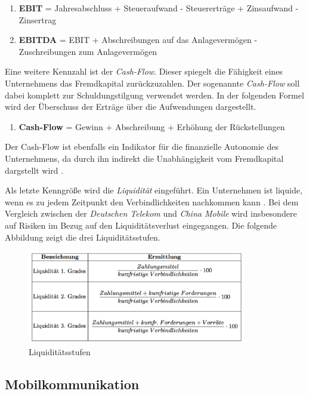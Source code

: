 \begin{enumerate}
\item \textbf{EBIT} = Jahresabschluss + Steueraufwand - Steuererträge + Zinsaufwand - Zinsertrag
\item \textbf{EBITDA} = EBIT + Abschreibungen auf das Anlagevermögen - Zuschreibungen zum Anlagevermögen 
\end{enumerate}  

Eine weitere Kennzahl ist der \textit{Cash-Flow}. Dieser spiegelt die Fähigkeit eines Unternehmens das Fremdkapital zurückzuzahlen. Der sogenannte \textit{Cash-Flow} soll dabei komplett zur Schuldungstilgung verwendet werden. In der folgenden Formel wird der Überschuss der Erträge über die Aufwendungen dargestellt.

\begin{enumerate}
\item \textbf{Cash-Flow} = Gewinn + Abschreibung + Erhöhung der Rückstellungen 
\end{enumerate}

Der Cash-Flow ist ebenfalls ein Indikator für die finanzielle Autonomie des Unternehmens, da durch ihn indirekt die Unabhängigkeit vom Fremdkapital dargstellt wird \cite{muller}.

Als letzte Kenngröße wird die \textit{Liquidität} eingeführt. Ein Unternehmen ist liquide, wenn es zu jedem Zeitpunkt den Verbindlichkeiten nachkommen kann \cite{muller}. Bei dem Vergleich zwischen der \textit{Deutschen Telekom} und \textit{China Mobile} wird insbesondere auf Risiken im Bezug auf den Liquiditätsverlust eingegangen. Die folgende Abbildung zeigt die drei Liquiditätsstufen.

\begin{figure}[H]
\centering
\includegraphics[width=0.85\textwidth]{pictures/liquidity.png}
\caption{Liquiditätsstufen \cite{muller}}
\label{fig:liquidity}
\end{figure}

\subsection{Mobilkommunikation}

